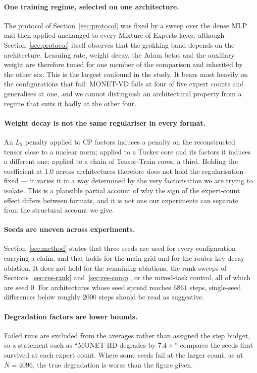 \paragraph{One training regime, selected on one architecture.} The protocol of
Section~\ref{sec:protocol} was fixed by a sweep over the dense MLP and then
applied unchanged to every Mixture-of-Experts layer, although
Section~\ref{sec:protocol} itself observes that the grokking band depends on
the architecture. Learning rate, weight decay, the Adam betas and the
auxiliary weight are therefore tuned for one member of the comparison and
inherited by the other six. This is the largest confound in the study. It
bears most heavily on the configurations that fail: MONET-VD fails at four of
five expert counts and generalises at one, and we cannot distinguish an
architectural property from a regime that suits it badly at the other four.

\paragraph{Weight decay is not the same regulariser in every format.} An $L_2$
penalty applied to CP factors induces a penalty on the reconstructed tensor
close to a nuclear norm; applied to a Tucker core and its factors it induces a
different one; applied to a chain of Tensor-Train cores, a third. Holding the
coefficient at $1.0$ across architectures therefore does not hold the
regularisation fixed --- it varies it in a way determined by the very
factorisation we are trying to isolate. This is a plausible partial account of
why the sign of the expert-count effect differs between formats, and it is not
one our experiments can separate from the structural account we give.

\paragraph{Seeds are uneven across experiments.} Section~\ref{sec:method}
states that three seeds are used for every configuration carrying a claim, and
that holds for the main grid and for the router-key decay ablation. It does
not hold for the remaining ablations, the rank sweeps of
Sections~\ref{sec:res-rank} and~\ref{sec:res-comp}, or the mixed-task control,
all of which are seed $0$. For architectures whose seed spread reaches $6861$
steps, single-seed differences below roughly $2000$ steps should be read as
suggestive.

\paragraph{Degradation factors are lower bounds.} Failed runs are excluded
from the averages rather than assigned the step budget, so a statement such as
``MONET-HD degrades by $7.4\times$'' compares the seeds that survived at each
expert count. Where some seeds fail at the larger count, as at $N = 4096$, the
true degradation is worse than the figure given.

